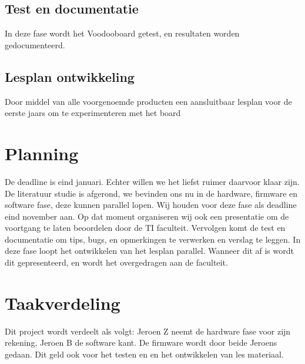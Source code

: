 \documentclass{article}
\begin{document}
\subsection{Test en documentatie}
In deze fase wordt het Voodooboard getest, en resultaten worden gedocumenteerd.
\subsection{Lesplan ontwikkeling}
Door middel van alle voorgenoemde producten een aansluitbaar lesplan voor de eerste jaars om te experimenteren met het board 
\section{Planning}
De deadline is eind januari. Echter willen we het liefst ruimer daarvoor klaar zijn. De literatuur studie is afgerond, we bevinden ons nu in de hardware, firmware en software fase, deze kunnen parallel lopen. Wij houden voor deze fase als deadline eind november aan. Op dat moment organiseren wij ook een presentatie om de voortgang te laten beoordelen door de TI faculteit. Vervolgen komt de test en documentatie om tips, bugs, en opmerkingen te verwerken en verslag te leggen. In deze fase loopt het ontwikkelen van het lesplan parallel. Wanneer dit af is wordt dit gepresenteerd, en wordt het overgedragen aan de faculteit.
\section{Taakverdeling}
Dit project wordt verdeelt als volgt: Jeroen Z neemt de hardware fase voor zijn rekening, Jeroen B de software kant. De firmware wordt door beide Jeroens gedaan. Dit geld ook voor het testen en en het ontwikkelen van les materiaal.
\end{document}

